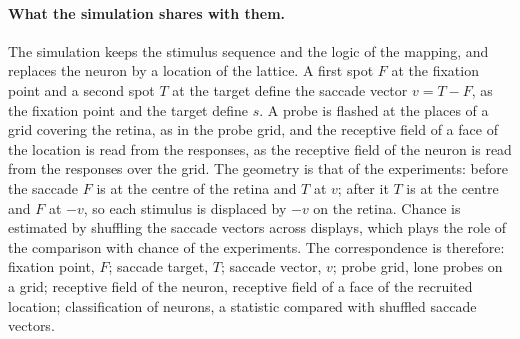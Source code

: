 \documentclass[14pt]{article}
\begin{document}
\paragraph{What the simulation shares with them.}
The simulation keeps the stimulus sequence and the logic of the mapping, and replaces the neuron by a location of the lattice.
A first spot $F$ at the fixation point and a second spot $T$ at the target define the saccade vector $v=T-F$, as the fixation point and the target define $s$.
A probe is flashed at the places of a grid covering the retina, as in the probe grid, and the receptive field of a face of the location is read from the responses, as the receptive field of the neuron is read from the responses over the grid.
The geometry is that of the experiments: before the saccade $F$ is at the centre of the retina and $T$ at $v$; after it $T$ is at the centre and $F$ at $-v$, so each stimulus is displaced by $-v$ on the retina.
Chance is estimated by shuffling the saccade vectors across displays, which plays the role of the comparison with chance of the experiments.
The correspondence is therefore: fixation point, $F$; saccade target, $T$; saccade vector, $v$; probe grid, lone probes on a grid; receptive field of the neuron, receptive field of a face of the recruited location; classification of neurons, a statistic compared with shuffled saccade vectors.
\end{document}
